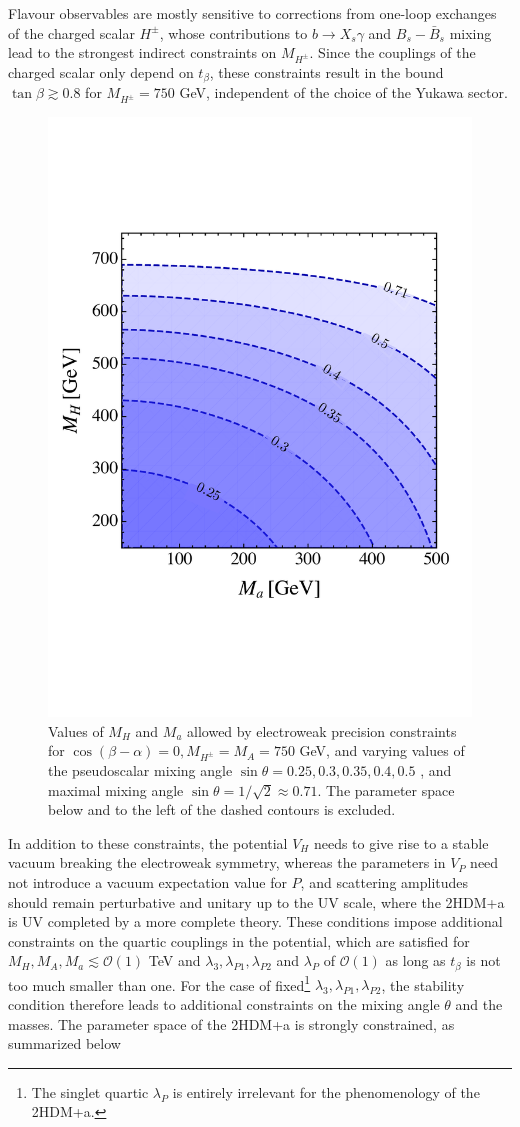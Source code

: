 Flavour observables are mostly sensitive to corrections from one-loop exchanges of the charged scalar ${H^\pm}$, whose contributions to $b \to X_s \gamma$ \cite{Hermann:2012fc,Misiak:2015xwa,Czakon:2015exa} and $B_s-\bar B_s$ mixing \cite{Abbott:1979dt,Geng:1988bq,Buras:1989ui,Eberhardt:2013uba} lead to the strongest indirect constraints on $M_{H^\pm}$. Since the couplings of the charged scalar only depend on $t_\beta$, these constraints result in the bound $\tan \beta \gtrsim 0.8$ for $M_{H^\pm}=750$ GeV, independent of the choice of the Yukawa sector.\\
\begin{figure}
\centering
\includegraphics[width=.5\textwidth]{Figs/EWPM}
\caption{\label{fig:EWPM}Values of $M_H$ and $M_a$ allowed by electroweak precision constraints for $\cos(\beta-\alpha)=0, M_{H^\pm}=M_A=750$ GeV, and varying values of the pseudoscalar mixing angle $\sin \theta =0.25, 0.3, 0.35, 0.4, 0.5$ , and maximal mixing angle $\sin\theta =1/\sqrt{2}\approx 0.71$. The parameter space below and to the left of the dashed contours is excluded. }
\end{figure}
In addition to these constraints, the potential $V_H$ needs to give rise to a stable vacuum breaking the electroweak symmetry, whereas the parameters in $V_P$ need not introduce a vacuum expectation value for $P$, and scattering amplitudes should remain perturbative \cite{Gunion:2002zf,Barroso:2013awa} and unitary \cite{Kanemura:1993hm,Akeroyd:2000wc,Ginzburg:2005dt,Grinstein:2015rtl} up to the UV scale, where the 2HDM+a is UV completed by a more complete theory.  These conditions impose additional constraints on the quartic couplings in the potential, which are satisfied for $M_H, M_A, M_a \lesssim \mathcal{O}(1)$ TeV and $\lambda_3, \lambda_{P1}, \lambda_{P2}$ and $\lambda_P$ of $\mathcal{O}(1)$ as long as $t_\beta$ is not too much smaller than one. For the case of fixed\footnote{The singlet quartic $\lambda_P$ is entirely irrelevant for the phenomenology of the 2HDM+a.} $\lambda_3, \lambda_{P1}, \lambda_{P2}$, the stability condition therefore leads to additional constraints on the mixing angle $\theta$ and the masses. The parameter space of the 2HDM+a is strongly constrained, as summarized below
